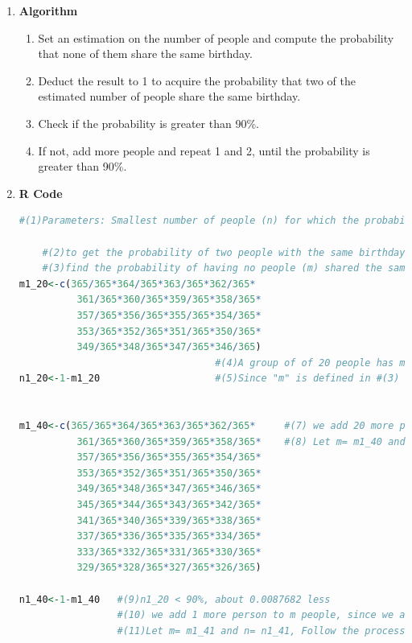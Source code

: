 \documentclass[12pt,letterpaper]{article}
\begin{document}
\begin{enumerate}[label=\Alph*]
	\item \textbf{Algorithm}
	\begin{enumerate}
		\item[1] Set an estimation on the number of people and compute the probability that none of them share the same birthday.
		\item[2] Deduct the result to 1 to acquire the probability that two of the estimated number of people share the same birthday.
		\item[3] Check if the probability is greater than 90\%.
		\item[4] If not, add more people and repeat 1 and 2, until the probability is greater than 90\%.
	\end{enumerate}
	
	\item \textbf{R Code}
	
	\begin{lstlisting}[language=R]
	#(1)Parameters: Smallest number of people (n) for which the probability that the two people in the group share a birthday is greater than 90%.

    #(2)to get the probability of two people with the same birthday in n people.
    #(3)find the probability of having no people (m) shared the same birthday
m1_20<-c(365/365*364/365*363/365*362/365*
          361/365*360/365*359/365*358/365*
          357/365*356/365*355/365*354/365*
          353/365*352/365*351/365*350/365*
          349/365*348/365*347/365*346/365)
                                  #(4)A group of of 20 people has m1_20=0.5885616 to get "n1_20" we subtract "m1_20" to 1, 
n1_20<-1-m1_20                    #(5)Since "m" is defined in #(3) as no people that shares the same birthday
                                             		                #(6)n1_20 < 90%

m1_40<-c(365/365*364/365*363/365*362/365*     #(7) we add 20 more people, since n1_20 < 90% and we need n > 90%
          361/365*360/365*359/365*358/365*    #(8) Let m= m1_40 and n= n1_n40, Follow the process we did at (5)
          357/365*356/365*355/365*354/365*
          353/365*352/365*351/365*350/365*
          349/365*348/365*347/365*346/365*
          345/365*344/365*343/365*342/365*    
          341/365*340/365*339/365*338/365*
          337/365*336/365*335/365*334/365*
          333/365*332/365*331/365*330/365*
          329/365*328/365*327/365*326/365)   

n1_40<-1-m1_40   #(9)n1_20 < 90%, about 0.0087682 less
                 #(10) we add 1 more person to m people, since we are relatively getting closer to 90%
                 #(11)Let m= m1_41 and n= n1_41, Follow the process we did at (5) and (8)


\end{lstlisting}
\end{enumerate}
\end{document}
